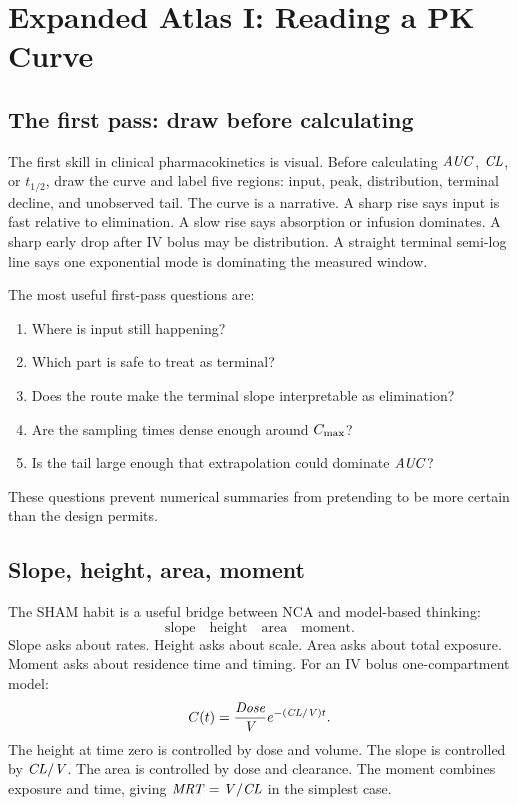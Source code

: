 \section{Expanded Atlas I: Reading a PK Curve}

\subsection{The first pass: draw before calculating}

The first skill in clinical pharmacokinetics is visual. Before calculating \(\pkAUC\), \(\pkCL\), or \(t_{1/2}\), draw the curve and label five regions: input, peak, distribution, terminal decline, and unobserved tail. The curve is a narrative. A sharp rise says input is fast relative to elimination. A slow rise says absorption or infusion dominates. A sharp early drop after IV bolus may be distribution. A straight terminal semi-log line says one exponential mode is dominating the measured window.

The most useful first-pass questions are:
\begin{enumerate}[leftmargin=2em]
  \item Where is input still happening?
  \item Which part is safe to treat as terminal?
  \item Does the route make the terminal slope interpretable as elimination?
  \item Are the sampling times dense enough around \(C_{\max}\)?
  \item Is the tail large enough that extrapolation could dominate \(\pkAUC\)?
\end{enumerate}
These questions prevent numerical summaries from pretending to be more certain than the design permits.

\subsection{Slope, height, area, moment}

The SHAM habit is a useful bridge between NCA and model-based thinking:
\[
  \text{slope}\quad
  \text{height}\quad
  \text{area}\quad
  \text{moment}.
\]
Slope asks about rates. Height asks about scale. Area asks about total exposure. Moment asks about residence time and timing. For an IV bolus one-compartment model:
\[
  C(t)=\frac{\pksym{Dose}}{\pkV}e^{-(\pkCL/\pkV)t}.
\]
The height at time zero is controlled by dose and volume. The slope is controlled by \(\pkCL/\pkV\). The area is controlled by dose and clearance. The moment combines exposure and time, giving \(\pkMRT=\pkV/\pkCL\) in the simplest case.

